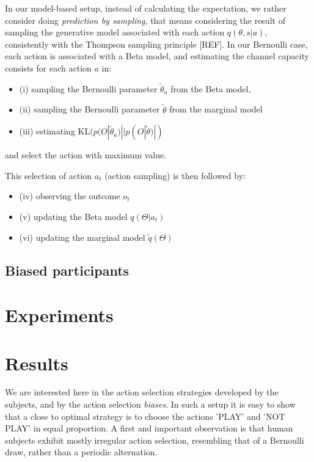 \documentclass[10pt,letterpaper]{article}
\begin{document}
In our model-based setup, instead of calculating the expectation, we rather consider doing \emph{prediction by sampling}, that means considering the result of sampling the generative model associated with each action $q(\theta,s|a)$, consistently with the Thompson sampling principle [REF].  
In our Bernoulli case,  each action is associated with a Beta model, and estimating the channel capacity consists for each action $a$ in:
\begin{itemize}
    \item (i) sampling the Bernoulli parameter $\tilde{\theta}_a$ from the Beta model,
    \item (ii) sampling the Bernoulli parameter $\tilde{\theta}$ from the marginal model
    \item (iii) estimating $\text{KL}(p(O|\tilde{\theta}_a)||p(O|\tilde{\theta})|)$
\end{itemize}   
and select the action with maximum value. 

This selection of action $a_t$ (action sampling) is then followed by:
\begin{itemize}
\item (iv) observing the outcome $o_t$
\item (v) updating the Beta model $q(\Theta|a_t)$
\item (vi) updating the marginal model $\tilde{q}(\Theta)$
\end{itemize}


\subsection{Biased participants}




\section{Experiments}


\section{Results}
We are interested here in the action selection strategies developed by the subjects, and by the action selection \emph{biases}. In such a setup it is easy to show that a close to optimal strategy is to choose the actions 'PLAY' and 'NOT PLAY' in equal proportion. A first and important observation is that human subjects exhibit mostly irregular action selection, resembling that of a Bernoulli draw, rather than a periodic alternation. %
\end{document}
